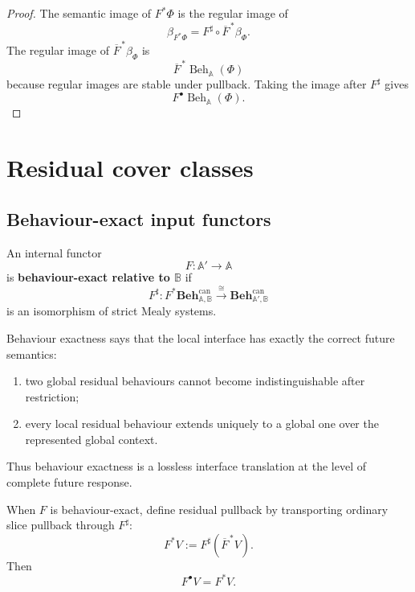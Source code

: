\begin{proof}
The semantic image of \(F^\ast\Phi\) is the regular image of
\[
    \beta_{F^\ast\Phi}
    =
    F^\sharp
    \circ
    \overline F^{\,\ast}\beta_\Phi.
\]
The regular image of
\(\overline F^{\,\ast}\beta_\Phi\) is
\[
    \overline F^{\,\ast}
    \operatorname{Beh}_{\mathbb A}(\Phi)
\]
because regular images are stable under pullback. Taking the image after
\(F^\sharp\) gives
\[
    F^\bullet
    \operatorname{Beh}_{\mathbb A}(\Phi).
\]
\end{proof}

\section{Residual cover classes}
\label{sec:residual-cover-classes}

\subsection{Behaviour-exact input functors}
\label{subsec:behaviour-exact-input-functors}

\begin{definition}
\label{def:behaviour-exact-input-functor}
An internal functor
\[
    F:\mathbb A'\to\mathbb A
\]
is \textbf{behaviour-exact relative to \(\mathbb B\)} if
\[
    F^\sharp:
    F^\ast
    \mathbf{Beh}^{\mathrm{can}}_{\mathbb A,\mathbb B}
    \xrightarrow{\cong}
    \mathbf{Beh}^{\mathrm{can}}_{\mathbb A',\mathbb B}
\]
is an isomorphism of strict Mealy systems.
\end{definition}

Behaviour exactness says that the local interface has exactly the correct
future semantics:
\begin{enumerate}
    \item two global residual behaviours cannot become indistinguishable after
    restriction;
    \item every local residual behaviour extends uniquely to a global one over
    the represented global context.
\end{enumerate}

Thus behaviour exactness is a lossless interface translation at the level of
complete future response.

When \(F\) is behaviour-exact, define residual pullback by transporting
ordinary slice pullback through \(F^\sharp\):
\[
    F^\ast V
    :=
    F^\sharp
    \left(
        \overline F^{\,\ast}V
    \right).
\]
Then
\[
    F^\bullet V
    =
    F^\ast V.
\]

